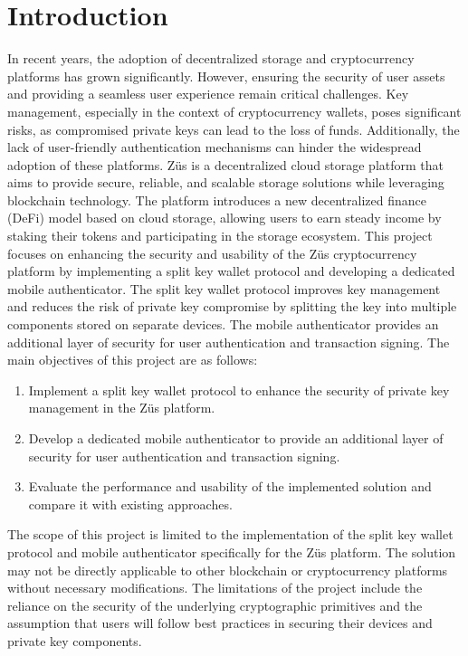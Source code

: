 \chapter{Introduction}
\label{Chapter1}
In recent years, the adoption of decentralized storage and cryptocurrency platforms has grown significantly. However, ensuring the security of user assets and providing a seamless user experience remain critical challenges. Key management, especially in the context of cryptocurrency wallets, poses significant risks, as compromised private keys can lead to the loss of funds. Additionally, the lack of user-friendly authentication mechanisms can hinder the widespread adoption of these platforms.
Züs is a decentralized cloud storage platform that aims to provide secure, reliable, and scalable storage solutions while leveraging blockchain technology. The platform introduces a new decentralized finance (DeFi) model based on cloud storage, allowing users to earn steady income by staking their tokens and participating in the storage ecosystem.
This project focuses on enhancing the security and usability of the Züs cryptocurrency platform by implementing a split key wallet protocol and developing a dedicated mobile authenticator. The split key wallet protocol improves key management and reduces the risk of private key compromise by splitting the key into multiple components stored on separate devices. The mobile authenticator provides an additional layer of security for user authentication and transaction signing.
The main objectives of this project are as follows:
\begin{enumerate}
\item Implement a split key wallet protocol to enhance the security of private key management in the Züs platform.
\item Develop a dedicated mobile authenticator to provide an additional layer of security for user authentication and transaction signing.
\item Evaluate the performance and usability of the implemented solution and compare it with existing approaches.
\end{enumerate}
The scope of this project is limited to the implementation of the split key wallet protocol and mobile authenticator specifically for the Züs platform. The solution may not be directly applicable to other blockchain or cryptocurrency platforms without necessary modifications.
The limitations of the project include the reliance on the security of the underlying cryptographic primitives and the assumption that users will follow best practices in securing their devices and private key components.
